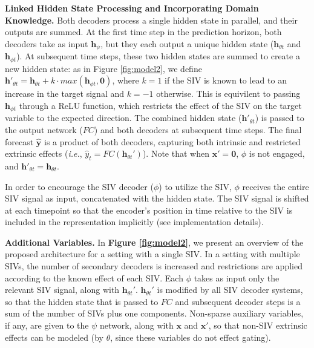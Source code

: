 \documentclass[letterpaper]{article}
\begin{document}
\textbf{Linked Hidden State Processing and Incorporating Domain Knowledge.} Both decoders process a single hidden state in parallel, and their outputs are summed. At the first time step in the prediction horizon, both decoders take as input $\mathbf{h}_{\psi}$, but they each output a unique hidden state ($\mathbf{h}_{{\theta}t}$ and $\mathbf{h}_{{\phi}t}$).  At subsequent time steps, these two hidden states are summed to create a new hidden state: as in Figure \ref{fig:model2}, we define $\mathbf{h}'_{{\theta}t} = \mathbf{h}_{{\theta}t} + k\cdot max(\mathbf{h}_{{\phi}t},\mathbf{0})$, where $k=1$ if the SIV is known to lead to an increase in the target signal and $k=-1$ otherwise. This is equivilent to passing $\mathbf{h}_{{\phi}t}$ through a ReLU function, which restricts the effect of the SIV on the target variable to the expected direction. The combined hidden state ($\mathbf{h}'_{{\theta}t}$) is passed to the output network ($FC$) and both decoders at subsequent time steps.  The final forecast $\hat{\mathbf{y}}$ is a product of both decoders, capturing both intrinsic and restricted extrinsic effects (\textit{i.e.}, $\hat{y}_t=FC(\mathbf{h}_{{\theta}t}')$). Note that when $\mathbf{x}'=\mathbf{0}$, $\phi$ is not engaged, and $\mathbf{h}'_{{\theta}t}=\mathbf{h}_{{\theta}t}$.

In order to encourage the SIV decoder ($\phi$) to utilize the SIV, $\phi$ receives the entire SIV signal as input, concatenated with the hidden state. The SIV signal is shifted at each timepoint so that the encoder's position in time relative to the SIV is included in the representation implicitly (see implementation details).








\textbf{Additional Variables.} In \textbf{Figure \ref{fig:model2}}, we present an overview of the proposed architecture for a setting with a single SIV. In a setting with multiple SIVs, the number of secondary decoders is increased and restrictions are applied according to the known effect of each SIV. Each $\phi$ takes as input only the relevant SIV signal, along with $\mathbf{h}_{{\theta}t}'$.  $\mathbf{h}_{{\theta}t}'$ is modified by all SIV decoder systems, so that the hidden state that is passed to $FC$ and subsequent decoder steps is a sum of the number of SIVs plus one components. Non-sparse auxiliary variables, if any, are given to the $\psi$ network, along with $\mathbf{x}$ and $\mathbf{x}'$, so that non-SIV extrinsic effects can be modeled (by $\theta$, since these variables do not effect gating).
\end{document}
